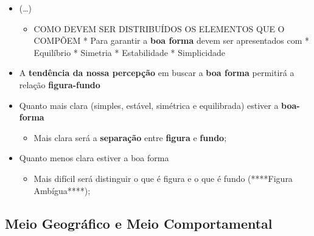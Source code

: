 \documentclass[
]{book}
\providecommand{\tightlist}{%
  \setlength{\itemsep}{0pt}\setlength{\parskip}{0pt}}
\begin{document}
\begin{itemize}
\tightlist
\item
  (\ldots)

  \begin{itemize}
  \tightlist
  \item
    COMO DEVEM SER DISTRIBUÍDOS OS ELEMENTOS QUE O COMPÕEM
    * Para garantir a \textbf{boa forma} devem ser apresentados com
    * Equilíbrio
    * Simetria
    * Estabilidade
    * Simplicidade
  \end{itemize}
\item
  A \textbf{tendência da nossa percepção} em buscar a \textbf{boa forma} permitirá a relação \textbf{figura-fundo}
\item
  Quanto mais clara (simples, estável, simétrica e equilibrada) estiver a \textbf{boa-forma}

  \begin{itemize}
  \tightlist
  \item
    Mais clara será a \textbf{separação} entre \textbf{figura} e \textbf{fundo};
  \end{itemize}
\item
  Quanto menos clara estiver a boa forma

  \begin{itemize}
  \tightlist
  \item
    Mais difícil será distinguir o que é figura e o que é fundo (****Figura Ambígua****);
  \end{itemize}
\end{itemize}

\hypertarget{meio-geogruxe1fico-e-meio-comportamental}{%
\subsection{Meio Geográfico e Meio Comportamental}\label{meio-geogruxe1fico-e-meio-comportamental}}
\end{document}
